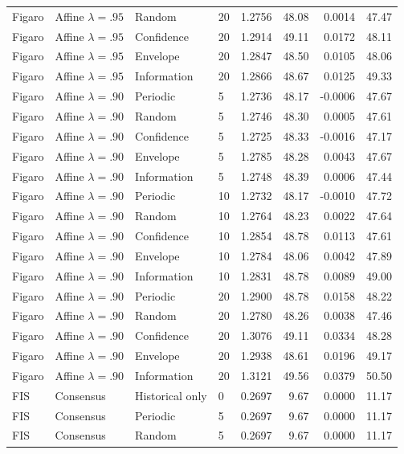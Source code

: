 \begin{longtable}{llllrrrr}
Figaro & Affine $\lambda=.95$ & Random & 20 & 1.2756 & 48.08 & 0.0014 & 47.47 \\
Figaro & Affine $\lambda=.95$ & Confidence & 20 & 1.2914 & 49.11 & 0.0172 & 48.11 \\
Figaro & Affine $\lambda=.95$ & Envelope & 20 & 1.2847 & 48.50 & 0.0105 & 48.06 \\
Figaro & Affine $\lambda=.95$ & Information & 20 & 1.2866 & 48.67 & 0.0125 & 49.33 \\
Figaro & Affine $\lambda=.90$ & Periodic & 5 & 1.2736 & 48.17 & -0.0006 & 47.67 \\
Figaro & Affine $\lambda=.90$ & Random & 5 & 1.2746 & 48.30 & 0.0005 & 47.61 \\
Figaro & Affine $\lambda=.90$ & Confidence & 5 & 1.2725 & 48.33 & -0.0016 & 47.17 \\
Figaro & Affine $\lambda=.90$ & Envelope & 5 & 1.2785 & 48.28 & 0.0043 & 47.67 \\
Figaro & Affine $\lambda=.90$ & Information & 5 & 1.2748 & 48.39 & 0.0006 & 47.44 \\
Figaro & Affine $\lambda=.90$ & Periodic & 10 & 1.2732 & 48.17 & -0.0010 & 47.72 \\
Figaro & Affine $\lambda=.90$ & Random & 10 & 1.2764 & 48.23 & 0.0022 & 47.64 \\
Figaro & Affine $\lambda=.90$ & Confidence & 10 & 1.2854 & 48.78 & 0.0113 & 47.61 \\
Figaro & Affine $\lambda=.90$ & Envelope & 10 & 1.2784 & 48.06 & 0.0042 & 47.89 \\
Figaro & Affine $\lambda=.90$ & Information & 10 & 1.2831 & 48.78 & 0.0089 & 49.00 \\
Figaro & Affine $\lambda=.90$ & Periodic & 20 & 1.2900 & 48.78 & 0.0158 & 48.22 \\
Figaro & Affine $\lambda=.90$ & Random & 20 & 1.2780 & 48.26 & 0.0038 & 47.46 \\
Figaro & Affine $\lambda=.90$ & Confidence & 20 & 1.3076 & 49.11 & 0.0334 & 48.28 \\
Figaro & Affine $\lambda=.90$ & Envelope & 20 & 1.2938 & 48.61 & 0.0196 & 49.17 \\
Figaro & Affine $\lambda=.90$ & Information & 20 & 1.3121 & 49.56 & 0.0379 & 50.50 \\
FIS & Consensus & Historical only & 0 & 0.2697 & 9.67 & 0.0000 & 11.17 \\
FIS & Consensus & Periodic & 5 & 0.2697 & 9.67 & 0.0000 & 11.17 \\
FIS & Consensus & Random & 5 & 0.2697 & 9.67 & 0.0000 & 11.17 \\

\end{longtable}
